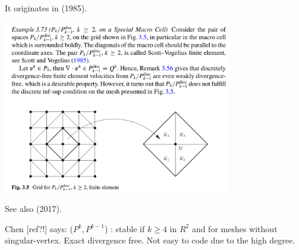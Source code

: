 
It originates in \textcite{scvo85} (1985). 

\begin{center}
\includegraphics[width=10cm]{images/pair_scott_vogelius/john_scott_vogelius}\\
\end{center}

See also \textcite{jolm17} (2017). 

Chen [ref?!] says: ($P^k ,P^{k-1}$) : stable if $k \ge 4$ in $R^2$ and for meshes without
singular-vertex. Exact divergence free. Not easy to code due to the high degree.


